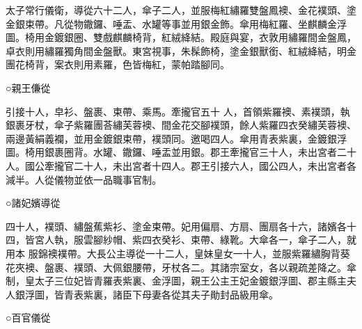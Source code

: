 \begin{pinyinscope}
 太子常行儀衛，導從六十二人，傘子二人，並服梅紅繡羅雙盤鳳襖、金花襆頭、塗金銀束帶。凡從物鏾鑼、唾盂、水罐等事並用銀金飾。傘用梅紅羅、坐麒麟金浮圖。椅用金鍍銀圈、雙戲麒麟椅背，紅絨絳結。殿庭與宴，衣敦用繡羅間金盤鳳，卓衣則用繡羅獨角間金盤獸。東宮視事，朱髹飾椅，塗金銀獸銜、紅絨絳結，明金團花椅背，案衣則用素羅，色皆梅紅，蒙帕踏腳同。



 ○親王傔從



 引接十人，皁衫、盤裹、束帶、乘馬。牽攏官五十
 人，首領紫羅襖、素襆頭，執銀裹牙杖，傘子紫羅團荅繡芙蓉襖、間金花交腳襆頭，餘人紫羅四衣癸繡芙蓉襖、兩邊黃絹義襴，並用金鍍銀束帶，襆頭同。邀喝四人。傘用青表紫裏，金鍍銀浮圖。椅用銀裹圈背。水罐、鏾鑼、唾盂並用銀。郡王牽攏官三十人，未出宮者二十人。國公牽攏官二十人，未出宮者十四人。郡王引接六人，國公四人，未出宮者各減半。人從儀物並依一品職事官制。



 ○諸妃嬪導從



 四十人，襆頭、繡盤蕉紫衫、塗金束帶。妃用偏扇、方扇、團扇各十六，諸嬪各十四，皆宮人執，服雲腳紗帽、紫四衣癸衫、束帶、綠靴。大傘各一，傘子二人，就用本
 服錦襖襆帶。大長公主導從一十二人，皇妹皇女一十人，並服紫羅繡胸背葵花夾襖、盤裹、襆頭、大佩銀腰帶，牙杖各二。其諸宗室女，各以親疏差降之。傘制，皇太子三位妃皆青羅表紫裏、金浮圖，親王公主王妃金鍍銀浮圖、郡主縣主夫人銀浮圖，皆青表紫裏，諸臣下母妻各從其夫子勛封品級用傘。



 ○百官儀從




\end{pinyinscope}
